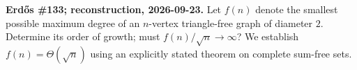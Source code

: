 \textbf{Erd\H{o}s \#133; reconstruction, 2026-09-23.}
Let $f(n)$ denote the smallest possible maximum degree of an $n$-vertex
triangle-free graph of diameter $2$. Determine its order of growth;
must $f(n)/\sqrt n\to\infty$? We establish $f(n)=\Theta(\sqrt n)$
using an explicitly stated theorem on complete sum-free sets.
